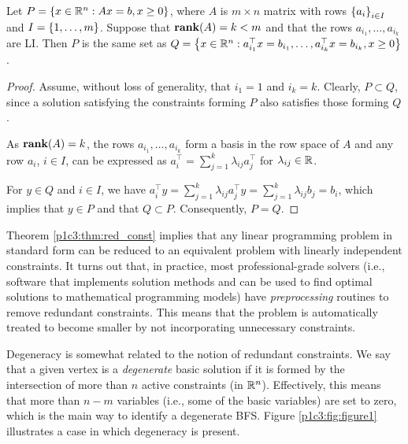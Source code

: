 \begin{theorem}\label{p1c3:thm:red_const}
	Let $P = \left\{ x \in \mathbb{R}^n : Ax = b, x \geq 0 \right \}$, where $A$ is $m \times n$ matrix with rows $\left\{ a_i \right \}_{i \in I}$ and $I = \left\{ 1,\dots,m \right \}$. Suppose that $\mathop{\bf rank}(A) = k < m$ and that the rows $a_{i_1}, \dots, a_{i_k}$ are LI. Then $P$ is the same set as $Q = \left\{  x \in \mathbb{R}^n : a^\top_{i_1}x = b_{i_1}, \dots, a^\top_{i_k}x = b_{i_k}, x \geq 0 \right \}$.
\end{theorem}

\begin{proof}
	Assume, without loss of generality, that $i_1 = 1$ and $i_k = k$. Clearly, $P \subset Q$, since a solution satisfying the constraints forming $P$ also satisfies those forming $Q$.
	
	As $\mathop{\bf rank}(A) = k$, the rows $a_{i_1}, \dots, a_{i_k}$ form a basis in the row space of $A$ and any row $a_i$, $i \in I$, can be expressed as $a^\top_i = \sum_{j=1}^k \lambda_{ij}a_j^\top$ for $\lambda_{ij} \in \mathbb{R}$.
	
	For $y \in Q$ and $i \in I$, we have $a_i^\top y = \sum_{j=1}^k \lambda_{ij}a_j^\top y = \sum_{j=1}^k \lambda_{ij}b_{j} = b_i$, which implies that $y \in P$ and that $Q \subset P$. Consequently, $P = Q$. \qedhere			
\end{proof}

Theorem \ref{p1c3:thm:red_const} implies that any linear programming problem in standard form can be reduced to an equivalent problem with linearly independent constraints. It turns out that, in practice, most professional-grade solvers (i.e., software that implements solution methods and can be used to find optimal solutions to mathematical programming models) have \emph{preprocessing} routines to remove redundant constraints. This means that the problem is automatically treated to become smaller by not incorporating unnecessary constraints. 

Degeneracy is somewhat related to the notion of redundant constraints. We say that a given vertex is a \emph{degenerate} basic solution if it is formed by the intersection of more than $n$ active constraints (in $\mathbb{R}^n$). Effectively, this means that more than $n-m$ variables (i.e., some of the basic variables) are set to zero, which is the main way to identify a degenerate BFS. Figure \ref{p1c3:fig:figure1} illustrates a case in which degeneracy is present.

